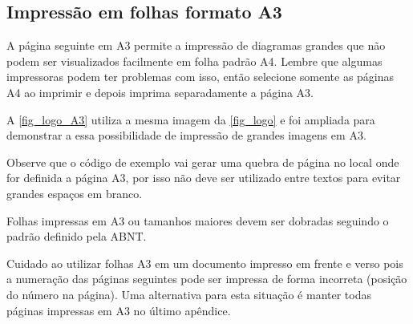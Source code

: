 
\subsection{Impressão em folhas formato A3}

A página seguinte em A3 permite a impressão de diagramas grandes que não podem ser visualizados facilmente em folha padrão A4. Lembre que algumas impressoras podem ter problemas com isso, então selecione somente as páginas A4 ao imprimir e depois imprima separadamente a página A3.

A \autoref{fig_logo_A3} utiliza a mesma imagem da \autoref{fig_logo} e foi ampliada para demonstrar a essa possibilidade de impressão de grandes imagens em A3.

Observe que o código de exemplo vai gerar uma quebra de página no local onde for definida a página A3, por isso não deve ser utilizado entre textos para evitar grandes espaços em branco.

Folhas impressas em A3 ou tamanhos maiores devem ser dobradas seguindo o padrão definido pela ABNT. 


Cuidado ao utilizar folhas A3 em um documento impresso em frente e verso pois a numeração das páginas seguintes pode ser impressa de forma incorreta (posição do número na página). Uma alternativa para esta situação é manter todas páginas impressas em A3 no último apêndice.



